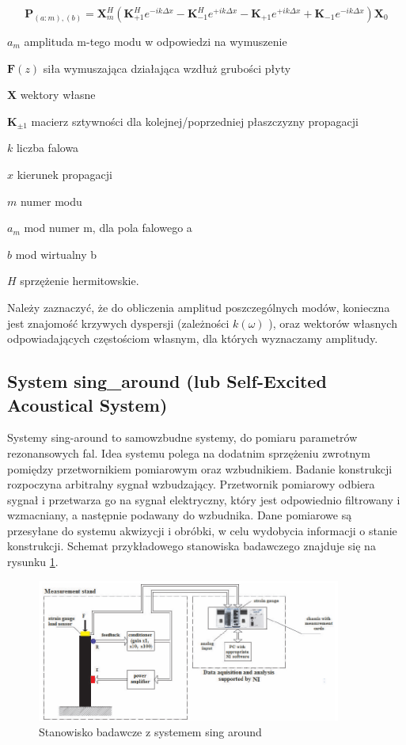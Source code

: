 \begin{equation} \label{eq:wzbudzanie3}
\textbf{P}_{(a:m),(b)} = \textbf{X}_m^{H} (\textbf{K}_{+1}^{H} e^{-ik\Delta x} - \textbf{K}_{-1}^{H} e^{+ik\Delta x} - \textbf{K}_{+1} e^{+ik\Delta x} + \textbf{K}_{-1} e^{-ik\Delta x})\textbf{X}_{0}
\end{equation}

\begin{eqwhere}[2cm]
	\item[$a_m$] amplituda m-tego modu w odpowiedzi na wymuszenie
	\item[$\textbf{F}(z)$] siła wymuszająca działająca wzdłuż grubości płyty
	\item[$\textbf{X}$] wektory własne 
	\item[$\textbf{K}_{\pm 1}$] macierz sztywności dla kolejnej/poprzedniej płaszczyzny propagacji
	\item[$k$] liczba falowa
	\item[$x$] kierunek propagacji
	\item[$m$] numer modu	
	\item[$a_m$] mod numer m, dla pola falowego a
	\item[$b$] mod wirtualny b	
	\item[$H$] sprzężenie hermitowskie.
\end{eqwhere}

Należy zaznaczyć, że do obliczenia amplitud poszczególnych modów, konieczna jest znajomość krzywych dyspersji (zależności \( k(\omega) \) ), oraz wektorów własnych odpowiadających częstościom własnym, dla których wyznaczamy amplitudy.

\subsection{System sing\_around (lub Self-Excited Acoustical System)}

Systemy sing-around to samowzbudne systemy, do pomiaru parametrów rezonansowych fal. Idea systemu polega na dodatnim sprzężeniu zwrotnym pomiędzy przetwornikiem pomiarowym oraz wzbudnikiem. Badanie konstrukcji rozpoczyna arbitralny sygnał wzbudzający. Przetwornik pomiarowy odbiera sygnał i przetwarza go na sygnał elektryczny, który jest odpowiednio filtrowany i wzmacniany, a następnie podawany do wzbudnika. Dane pomiarowe są przesyłane do systemu akwizycji i obróbki, w celu wydobycia informacji o stanie konstrukcji. Schemat przykładowego stanowiska badawczego znajduje się na rysunku \ref{fig:sing_around}.

\begin{figure}[h]
\centering
\includegraphics[width=10cm]{Zdjecia/2/sing_around}
\caption{Stanowisko badawcze z systemem sing around \cite{bartek_kwach}}
\label{fig:sing_around}
\end{figure}

